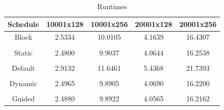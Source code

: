\begin{table}[htbp]
\begin{center}
   \begin{tabular}{|c|c|c|c|c|}
      \hline
      \textbf{Schedule} & \textbf{10001x128} & \textbf{10001x256} & \textbf{20001x128} & \textbf{20001x256}\\ \hline
      Block & 2.5334 & 10.0105 & 4.1639 & 16.4307 \\ \hline
              & & & & \\ \hline
      Static & 2.4800 & 9.9037 & 4.0644 & 16.2538 \\ \hline
             & & & & \\ \hline
      Default & 2.9132 & 11.6461 & 5.4368 & 21.7393 \\ \hline
              & & & & \\ \hline
      Dynamic & 2.4965 & 9.8905 & 4.0690 & 16.2200 \\ \hline
             & & & & \\ \hline
      Guided & 2.4880 & 9.8922 & 4.0565 & 16.2162 \\ \hline
      \end{tabular}
\end{center}
\caption{Runtimes}
\end{table}

